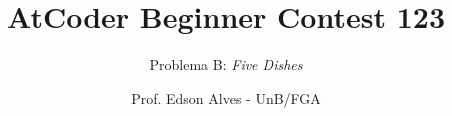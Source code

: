\title{AtCoder Beginner Contest 123}
\subtitle{Problema B: {\it Five Dishes}}
\author{Prof. Edson Alves - UnB/FGA}
\date{}
